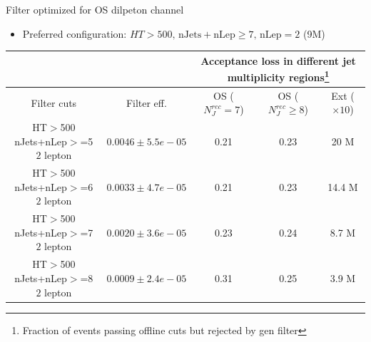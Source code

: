 \documentclass{beamer}
\begin{document}
\begin{frame}{Filter optimized for OS dilpeton channel}
\begin{itemize}
\item{\footnotesize  Preferred configuration: $HT>500,\, \mathrm{nJets+nLep}\geq7,\,  \mathrm{nLep}=2$ (9M)}
\end{itemize}
\begin{center}
{\tiny \begin{tabular}{|c|c|c|c|c|}
            \cline{1-5}
             & & \multicolumn{3}{|c|}{Acceptance loss in different jet multiplicity regions\footnote{Fraction of events passing offline cuts but rejected by gen filter}}\\
            \cline{1-5}
\hline Filter cuts      & Filter eff.   & OS  ($N_J^{rec}=7$)& OS ($N_J^{rec}\geq8$)&  Ext ($\times 10$) \\
\hline \thead{HT$>$500 \\  nJets+nLep$>$=5 \\  $2$ lepton} & $0.0046 \pm 5.5e-05$  & 0.21 & 0.23 & 20 M\\
\hline \thead{HT$>$500 \\  nJets+nLep$>$=6 \\  $2$ lepton} & $0.0033 \pm 4.7e-05$  & 0.21 & 0.23 & 14.4 M\\
\hline \rowcolor{lightgray} \thead{HT$>$500 \\  nJets+nLep$>$=7 \\  $2$ lepton} & $0.0020 \pm 3.6e-05$  & 0.23 & 0.24 & 8.7 M\\
\hline \thead{HT$>$500 \\  nJets+nLep$>$=8 \\  $2$ lepton} & $0.0009 \pm 2.4e-05$  & 0.31 & 0.25 & 3.9 M\\
\hline
\end{tabular} }
\end{center}

\end{frame}
\end{document}
